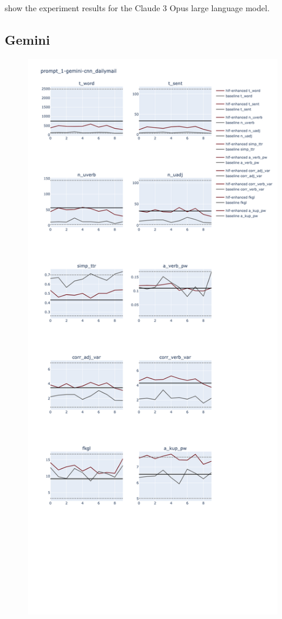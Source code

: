 \documentclass[a4paper,twoside]{article}
\begin{document}
show the experiment results for the Claude 3 Opus large language model.

\subsection{Gemini}

\begin{figure}[ht]
    \includegraphics[width=\textwidth,height=0.9\textheight,scale=1]{plots/prompt_1/prompt_1-gemini-cnn_dailymail/prompt_1-gemini-cnn_dailymail.png}

\end{figure}
\end{document}

